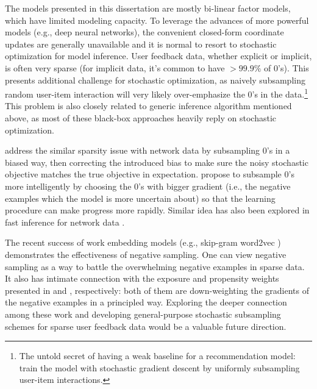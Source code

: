 The models presented in this dissertation are mostly bi-linear factor models, which have limited modeling capacity. To leverage the advances of more powerful models (e.g., deep neural networks), the convenient closed-form coordinate updates are generally unavailable and it is normal to resort to stochastic optimization for model inference. User feedback data, whether explicit or implicit, is often very sparse (for implicit data, it's common to have $>99.9\%$ of 0's). This presents additional challenge for stochastic optimization, as naively subsampling random user-item interaction will very likely over-emphasize the 0's in the data.\footnote{The untold secret of having a weak baseline for a recommendation model: train the model with stochastic gradient descent by uniformly subsampling user-item interactions.} This problem is also closely related to generic inference algorithm mentioned above, as most of these black-box approaches heavily reply on stochastic optimization.

\citet{gopalan2013efficient} address the similar sparsity issue with network data by subsampling 0's in a biased way, then correcting the introduced bias to make sure the noisy stochastic objective matches the true objective in expectation. 
\citet{rendle2014improving} propose to subsample 0's more intelligently by choosing the 0's with bigger gradient (i.e., the negative examples which the model is more uncertain about) so that the learning procedure can make progress more rapidly. Similar idea has also been explored in fast inference for network data \citep{raftery2012fast}. 

The recent success of work embedding models (e.g., skip-gram word2vec \citep{mikolov2013distributed}) demonstrates the effectiveness of negative sampling. One can view negative sampling as a way to battle the overwhelming negative examples in sparse data. It also has intimate connection with the exposure and propensity weights presented in  and , respectively: both of them are down-weighting the gradients of the negative examples in a principled way. Exploring the deeper connection among these work and developing general-purpose stochastic subsampling schemes for sparse user feedback data would be a valuable future direction. 


